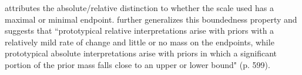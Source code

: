 \documentclass[12pt,letterpaper]{scrartcl}
\begin{document}
\cite{kennedy_vagueness_2007} attributes the absolute/relative distinction to whether the scale used has a maximal or minimal endpoint. \cite{lassiter_context_2013} further generalizes this boundedness property and suggests that ``prototypical relative interpretations arise with priors with a relatively mild rate of change and little or no mass on the endpoints, while prototypical absolute interpretations arise with priors in which a significant portion of the prior mass falls close to an upper or lower bound" (p. 599).
\end{document}
